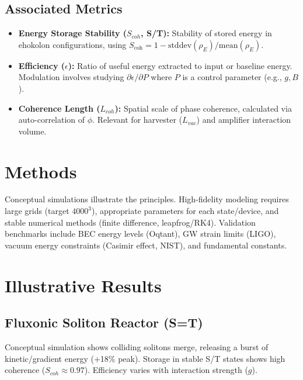 \documentclass[11pt]{article}
\begin{document}
\subsection{Associated Metrics}
\begin{itemize}
    \item \textbf{Energy Storage Stability (\(S_{coh}\), S/T):} Stability of stored energy in ehokolon configurations, using \(S_{\text{coh}} = 1 - \text{stddev}(\rho_{E}) / \text{mean}(\rho_{E})\).
    \item \textbf{Efficiency (\(\epsilon\)):} Ratio of useful energy extracted to input or baseline energy. Modulation involves studying \(\partial \epsilon / \partial P\) where \(P\) is a control parameter (e.g., \(g, B\)).
    \item \textbf{Coherence Length (\(L_{coh}\)):} Spatial scale of phase coherence, calculated via auto-correlation of \(\phi\). Relevant for harvester (\(L_{vac}\)) and amplifier interaction volume.
\end{itemize}

\section{Methods}
Conceptual simulations illustrate the principles. High-fidelity modeling requires large grids (target \(4000^3\)), appropriate parameters for each state/device, and stable numerical methods (finite difference, leapfrog/RK4). Validation benchmarks include BEC energy levels (Oqtant), GW strain limits (LIGO), vacuum energy constraints (Casimir effect, NIST), and fundamental constants.

\section{Illustrative Results}

\subsection{Fluxonic Soliton Reactor (S=T)}
Conceptual simulation shows colliding solitons merge, releasing a burst of kinetic/gradient energy (+18\% peak). Storage in stable S/T states shows high coherence (\(S_{coh} \approx 0.97\)). Efficiency varies with interaction strength (\(g\)).
\end{document}
